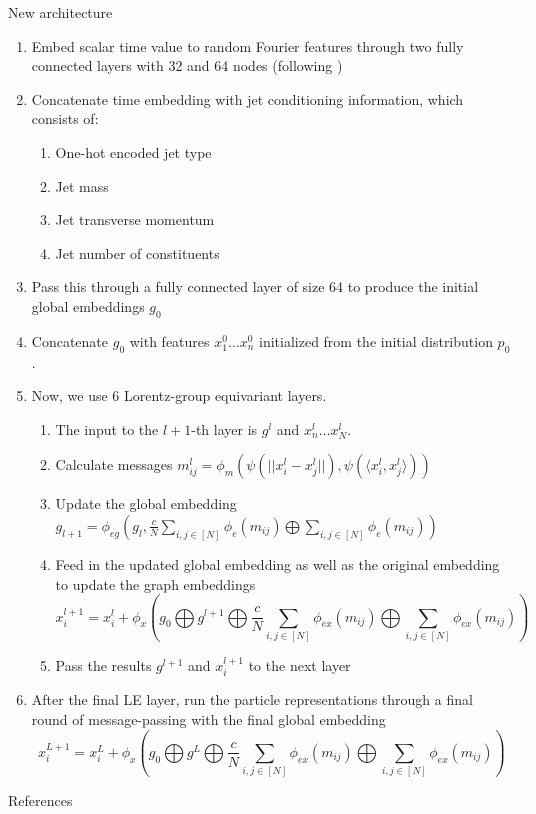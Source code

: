 \documentclass[handout, aspectratio=169,xcolor=dvipsnames]{beamer}
\begin{document}
\begin{frame}[allowframebreaks]{New architecture}
    \begin{enumerate}
        \item Embed scalar time value to random Fourier features through two fully connected layers with 32 and 64 nodes (following \cite{wuFastPointCloud2023})
        \item Concatenate time embedding with jet conditioning information, which consists of: \begin{enumerate}
            \item One-hot encoded jet type
            \item Jet mass
            \item Jet transverse momentum
            \item Jet number of constituents
        \end{enumerate}
        \item Pass this through a fully connected layer of size 64 to produce the initial global embeddings $g_0$
        \item Concatenate $g_0$ with features $x_1^0 \dots x_n^0$ initialized from the initial distribution $p_0$.
        \item Now, we use 6 Lorentz-group equivariant layers. \begin{enumerate}
            \item The input to the $l+1$-th layer is $g^l$ and $x^{l}_n \dots x^l_N$.
            \item Calculate messages $m^l_{ij} = \phi_m(\psi(||x_i^l - x_j^l||), \psi(\langle x_i^l, x_j^l \rangle))$
            \item Update the global embedding $g_{l+1} = \phi_{eg}(g_l, \frac{c}{N} \sum\limits_{i, j \in [N]} \phi_e(m_{ij}) \bigoplus \sum\limits_{i, j \in [N]} \phi_e(m_{ij}))$
            \item Feed in the updated global embedding as well as the original embedding to update the graph embeddings $$
            x_i^{l+1} = x_i^{l} + \phi_x(g_0 \bigoplus g^{l+1} \bigoplus \frac{c}{N} \sum\limits_{i, j \in [N]} \phi_{ex}(m_{ij}) \bigoplus \sum\limits_{i, j \in [N]} \phi_{ex}(m_{ij}))
            $$
            \item Pass the results $g^{l+1}$ and $x_i^{l+1}$ to the next layer
        \end{enumerate}
        \item After the final LE layer, run the particle representations through a final round of message-passing with the final global embedding $$
        x_i^{L+1} = x_i^{L} + \phi_x(g_0 \bigoplus g^{L} \bigoplus \frac{c}{N} \sum\limits_{i, j \in [N]} \phi_{ex}(m_{ij}) \bigoplus \sum\limits_{i, j \in [N]} \phi_{ex}(m_{ij}))
        $$
    \end{enumerate}
\end{frame}



\begin{frame}[allowframebreaks]{References}
\printbibliography
\end{frame}
\end{document}
